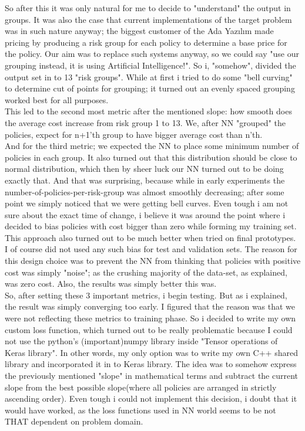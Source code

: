 \documentclass[titlepage, a4paper, 14pt]{extarticle} %
\begin{document}
So after this it was only natural for me to decide to "understand" the output in groups. It was also the case that current implementations of the target problem was in such nature anyway; the biggest customer of the Ada Yazılım made pricing by producing a risk group for each policy to determine a base price for the policy. Our aim was to replace such systems anyway, so we could say "use our grouping instead, it is using Artificial Intelligence!". So i, "somehow", divided the output set in to 13 "risk groups". While at first i tried to do some "bell curving" to determine cut of points for grouping; it turned out an evenly spaced grouping worked best for all purposes. \\

This led to the second most metric after the mentioned slope: how smooth does the average cost increase from risk group 1 to 13. We, after NN "grouped" the policies, expect for n+1'th group to have bigger average cost than n'th. \\

And for the third metric; we expected the NN to place some minimum number of policies in each group. It also turned out that this distribution should be close to normal distribution, which then by sheer luck our NN turned out to be doing exactly that. And that was surprising, because while in early experiments the number-of-policies-per-risk-group was almost smoothly decreasing; after some point we simply noticed that we were getting bell curves. Even tough i am not sure about the exact time of change, i believe it was around the point where i decided to bias policies with cost bigger than zero while forming my training set. This approach also turned out to be much better when tried on final prototypes. I of course did not used any such bias for test and validation sets. The reason for this design choice was to prevent the NN from thinking that policies with positive cost was simply "noise"; as the crushing majority of the data-set, as explained, was zero cost. Also, the results was simply better this was. \\

So, after setting these 3 important metrics, i begin testing. But as i explained, the result was simply converging too early. I figured that the reason was that we were not reflecting these metrics to training phase. So i decided to write my own custom loss function, which turned out to be really problematic because I could not use the python's (important)numpy library inside "Tensor operations of Keras library". In other words, my only option was to write my own C++ shared library and incorporated it in to Keras library. The idea was to somehow express the previously mentioned "slope" in mathematical terms and subtract the current slope from the best possible slope(where all policies are arranged in strictly ascending order). Even tough i could not implement this decision, i doubt that it would have worked, as the loss functions used in NN world seems to be not THAT dependent on problem domain.\\
\end{document}
